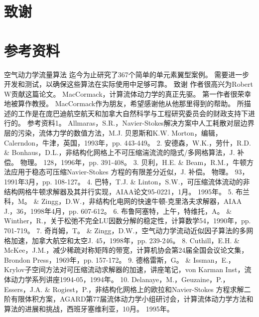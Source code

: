 \documentclass[UTF8,11pt,a4paper,openany,fontset=fandol]{ctexbook}
\begin{document}
\section{致谢}
\section{参考资料}
空气动力学流量算法 迄今为止研究了367个简单的单元素翼型案例。 需要进一步开发和测试，以确保这些算法在实际使用中足够可靠。 致谢 作者很高兴为Robert W贡献这篇论文。 MacCormack，计算流体动力学的真正先驱。 第一作者很荣幸地被算作教授。 MacCormack作为朋友，希望感谢他从他那里得到的帮助。 所描述的工作是在庞巴迪航空航天和加拿大自然科学与工程研究委员会的财政支持下进行的。 参考资料1。 Allmaras，S.R.，Navier-Stokes解决方案中人工耗散对层边界层的污染，流体力学的数值方法，M.J. 贝恩斯和K.W. Morton，编辑，Calerndon，牛津，英国，1993年，pp. 443-449。 2. 安德森，W.K.，劳什，R.D. \& Bonhaus，D.L.，非结构化网格上不可压缩湍流流的隐式/多网格算法，J. 补偿。 物理。 128，1996年，pp. 391-408。 3. 贝利，H.E. \& Beam，R.M.，牛顿方法应用于稳态可压缩Navier-Stokes 方程的有限差分近似，J. 补偿。 物理。 93，1991年3月，pp. 108-127。 4. 巴特，T.J. \& Linton，S.W.，可压缩流体流动的非结构网格牛顿求解器及其并行实现，AIAA论文95-0221，1月。 1995年。 5. 布兰科，M。 \& Zingg，D.W.，非结构化电网的快速牛顿-克里洛夫求解器，AIAA J.，36，1998年4月，pp. 607-612。 6. 布鲁阿塞特，上午，特维托，A。 \& Winther，R.，关于松弛不完全LU因数分解的稳定性，计算数学54，1990年，pp. 701-719。 7. 奇肖姆，T。 \& Zingg，D.W.，空气动力学流动近似因子算法的多网格加速，加拿大航空和太空J. 45，1998年，pp. 239-246。 8. Cuthill，E.H. \& McKee，J.M.，减少稀疏对称矩阵的带宽，计算机协会第24届全国会议论文集，Brondon Press，1969年，pp. 157-172。 9. 德格雷斯，G。 \& Issman，E.，Krylov子空间方法对可压缩流动求解器的加速，讲座笔记，von Karman Inst，流体动力学系列讲座1994-05，1994年。 10. Delanaye，M.，Geuzaine，P.，Essers，J.A. \& Rogiest，P.，非结构化网格上的欧拉和Navier-Stokes 方程求解二阶有限体积方案，AGARD第77届流体动力学小组研讨会，计算流体动力学方法和算法的进展和挑战，西班牙塞维利亚，10月。 1995年。
\end{document}
